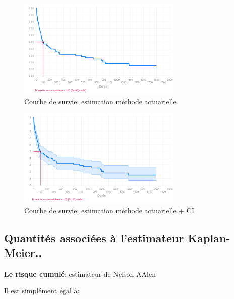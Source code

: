 \documentclass[
  12pt,
  letterpaper,
  DIV=11,
  numbers=noendperiod,
  onepage,
  openany]{scrreprt}
\begin{document}
\begin{figure}

\caption{Courbe de survie: estimation méthode actuarielle}

{\centering \includegraphics[width=0.7\textwidth,height=\textheight]{images/Image8.png}

}

\end{figure}

\begin{figure}

\caption{Courbe de survie: estimation méthode actuarielle + CI}

{\centering \includegraphics[width=0.7\textwidth,height=\textheight]{images/Image8b.png}

}

\end{figure}

\hypertarget{quantituxe9s-associuxe9es-uxe0-lestimateur-kaplan-meier..}{%
\subsection{Quantités associées à l'estimateur
Kaplan-Meier..}\label{quantituxe9s-associuxe9es-uxe0-lestimateur-kaplan-meier..}}

\textbf{Le risque cumulé}: estimateur de Nelson AAlen

Il est simplément égal à:
\end{document}
